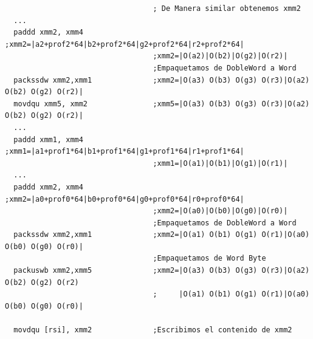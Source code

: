 \begin{codesnippet}
\begin{verbatim}    
                                  ; De Manera similar obtenemos xmm2
  ...
  paddd xmm2, xmm4                ;xmm2=|a2+prof2*64|b2+prof2*64|g2+prof2*64|r2+prof2*64|
                                  ;xmm2=|O(a2)|O(b2)|O(g2)|O(r2)|	
                                  ;Empaquetamos de DobleWord a Word	
  packssdw xmm2,xmm1              ;xmm2=|O(a3) O(b3) O(g3) O(r3)|O(a2) O(b2) O(g2) O(r2)|
  movdqu xmm5, xmm2               ;xmm5=|O(a3) O(b3) O(g3) O(r3)|O(a2) O(b2) O(g2) O(r2)|
  ...
  paddd xmm1, xmm4                ;xmm1=|a1+prof1*64|b1+prof1*64|g1+prof1*64|r1+prof1*64|
                                  ;xmm1=|O(a1)|O(b1)|O(g1)|O(r1)|						
  ...
  paddd xmm2, xmm4                ;xmm2=|a0+prof0*64|b0+prof0*64|g0+prof0*64|r0+prof0*64|
                                  ;xmm2=|O(a0)|O(b0)|O(g0)|O(r0)|                   
                                  ;Empaquetamos de DobleWord a Word
  packssdw xmm2,xmm1              ;xmm2=|O(a1) O(b1) O(g1) O(r1)|O(a0) O(b0) O(g0) O(r0)|						
                                  ;Empaquetamos de Word Byte
  packuswb xmm2,xmm5              ;xmm2=|O(a3) O(b3) O(g3) O(r3)|O(a2) O(b2) O(g2) O(r2)
                                  ;     |O(a1) O(b1) O(g1) O(r1)|O(a0) O(b0) O(g0) O(r0)|                      

  movdqu [rsi], xmm2              ;Escribimos el contenido de xmm2                        			
\end{verbatim}
\end{codesnippet}
